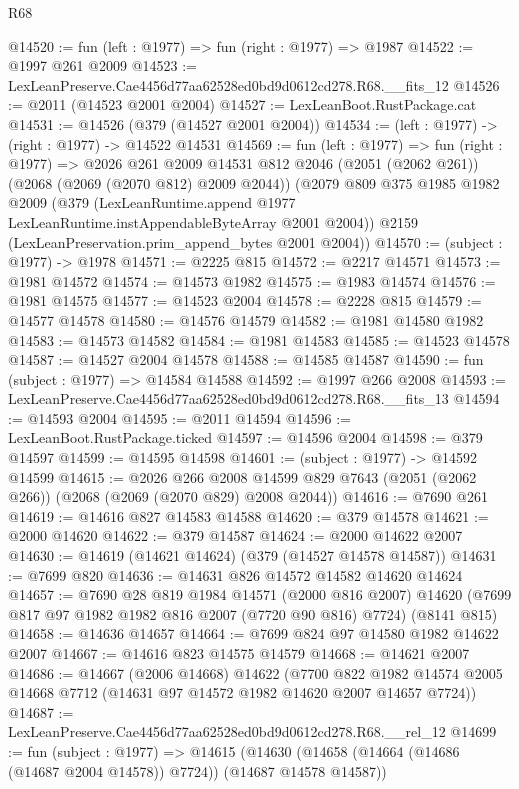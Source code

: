 \begin{lexlean}{R68}
\begin{coremodule}
@14520 := fun (left : @1977) => fun (right : @1977) => @1987
@14522 := @1997 @261 @2009
@14523 := LexLeanPreserve.Cae4456d77aa62528ed0bd9d0612cd278.R68.__fits_12
@14526 := @2011 (@14523 @2001 @2004)
@14527 := LexLeanBoot.RustPackage.cat
@14531 := @14526 (@379 (@14527 @2001 @2004))
@14534 := (left : @1977) -> (right : @1977) -> @14522 @14531
@14569 := fun (left : @1977) =>
  fun (right : @1977) =>
  @2026
    @261
    @2009
    @14531
    @812
    @2046
    (@2051 (@2062 @261))
    (@2068 (@2069 (@2070 @812) @2009 @2044))
    (@2079
      @809
      @375
      @1985
      @1982
      @2009
      (@379 (LexLeanRuntime.append @1977 LexLeanRuntime.instAppendableByteArray @2001 @2004))
      @2159
      (LexLeanPreservation.prim_append_bytes @2001 @2004))
@14570 := (subject : @1977) -> @1978
@14571 := @2225 @815
@14572 := @2217 @14571
@14573 := @1981 @14572
@14574 := @14573 @1982
@14575 := @1983 @14574
@14576 := @1981 @14575
@14577 := @14523 @2004
@14578 := @2228 @815
@14579 := @14577 @14578
@14580 := @14576 @14579
@14582 := @1981 @14580 @1982
@14583 := @14573 @14582
@14584 := @1981 @14583
@14585 := @14523 @14578
@14587 := @14527 @2004 @14578
@14588 := @14585 @14587
@14590 := fun (subject : @1977) => @14584 @14588
@14592 := @1997 @266 @2008
@14593 := LexLeanPreserve.Cae4456d77aa62528ed0bd9d0612cd278.R68.__fits_13
@14594 := @14593 @2004
@14595 := @2011 @14594
@14596 := LexLeanBoot.RustPackage.ticked
@14597 := @14596 @2004
@14598 := @379 @14597
@14599 := @14595 @14598
@14601 := (subject : @1977) -> @14592 @14599
@14615 := @2026
    @266
    @2008
    @14599
    @829
    @7643
    (@2051 (@2062 @266))
    (@2068 (@2069 (@2070 @829) @2008 @2044))
@14616 := @7690 @261
@14619 := @14616 @827 @14583 @14588
@14620 := @379 @14578
@14621 := @2000 @14620
@14622 := @379 @14587
@14624 := @2000 @14622 @2007
@14630 := @14619 (@14621 @14624) (@379 (@14527 @14578 @14587))
@14631 := @7699 @820
@14636 := @14631 @826 @14572 @14582 @14620 @14624
@14657 := @7690
    @28
    @819
    @1984
    @14571
    (@2000 @816 @2007)
    @14620
    (@7699 @817 @97 @1982 @1982 @816 @2007 (@7720 @90 @816) @7724)
    (@8141 @815)
@14658 := @14636 @14657
@14664 := @7699 @824 @97 @14580 @1982 @14622 @2007
@14667 := @14616 @823 @14575 @14579
@14668 := @14621 @2007
@14686 := @14667
    (@2006 @14668)
    @14622
    (@7700 @822 @1982 @14574 @2005 @14668 @7712 (@14631 @97 @14572 @1982 @14620 @2007 @14657 @7724))
@14687 := LexLeanPreserve.Cae4456d77aa62528ed0bd9d0612cd278.R68.__rel_12
@14699 := fun (subject : @1977) =>
  @14615 (@14630 (@14658 (@14664 (@14686 (@14687 @2004 @14578)) @7724)) (@14687 @14578 @14587))

\end{coremodule}
\end{lexlean}
